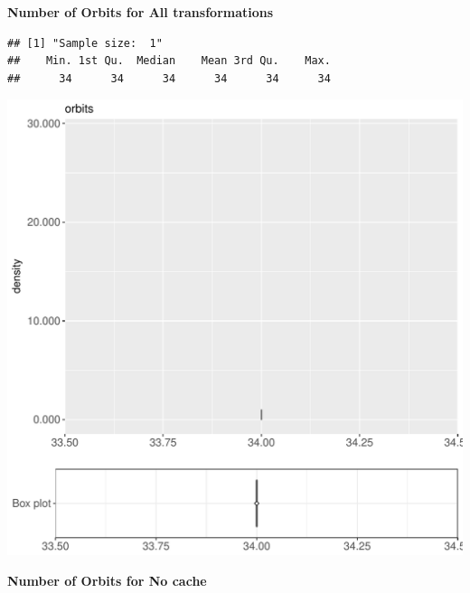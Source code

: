 \documentclass{article}\usepackage[]{graphicx}\usepackage[]{color}
\makeatletter
\def\maxwidth{ %
  \ifdim\Gin@nat@width>\linewidth
    \linewidth
  \else
    \Gin@nat@width
  \fi
}
\newenvironment{kframe}{%
 \def\at@end@of@kframe{}%
 \ifinner\ifhmode%
  \def\at@end@of@kframe{\end{minipage}}%
  \begin{minipage}{\columnwidth}%
 \fi\fi%
 \def\FrameCommand##1{\hskip\@totalleftmargin \hskip-\fboxsep
 \colorbox{shadecolor}{##1}\hskip-\fboxsep
     \hskip-\linewidth \hskip-\@totalleftmargin \hskip\columnwidth}%
 \MakeFramed {\advance\hsize-\width
   \@totalleftmargin\z@ \linewidth\hsize
   \@setminipage}}%
 {\par\unskip\endMakeFramed%
 \at@end@of@kframe}
\newenvironment{knitrout}{}{} %
\makeatother
\begin{document}
 \textbf{Number of Orbits for All transformations}
\begin{knitrout}
\color{fgcolor}\begin{kframe}
\begin{verbatim}
## [1] "Sample size:  1"
##    Min. 1st Qu.  Median    Mean 3rd Qu.    Max. 
##      34      34      34      34      34      34
\end{verbatim}


{\ttfamily\noindent\bfseries{}}\end{kframe}
\includegraphics[width=\maxwidth]{figure/RH4_cashew_big-1} 

\end{knitrout}
 \textbf{Number of Orbits for No cache}
\end{document}

